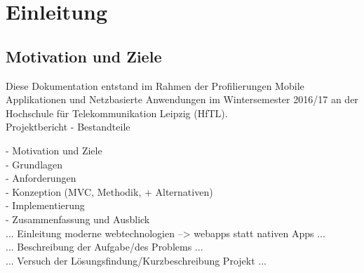 \chapter{Einleitung}
\section{Motivation und Ziele}

Diese Dokumentation entstand im Rahmen der Profilierungen  \glqq{}Mobile Applikationen\grqq{} und \glqq{}Netzbasierte Anwendungen\grqq{} im Wintersemester 2016/17 an der Hochschule für Telekommunikation Leipzig (HfTL). \\


Projektbericht - Bestandteile

- Motivation und Ziele\\
- Grundlagen \\
- Anforderungen \\  
- Konzeption (MVC, Methodik, + Alternativen) \\
- Implementierung \\
- Zusammenfassung und Ausblick \\


... Einleitung moderne webtechnologien --> webapps statt nativen Apps ... \\
... Beschreibung der Aufgabe/des Problems ...\\

... Versuch der Lösungsfindung/Kurzbeschreibung Projekt ... \\

